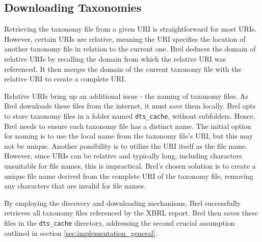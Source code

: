 
\subsection{Downloading Taxonomies}

Retrieving the taxonomy file from a given URI is straightforward for most URIs.
However, certain URIs are relative,
meaning the URI specifies the location of another taxonomy file in relation to the current one\cite{w3_relative_uri}.
Brel deduces the domain of relative URIs by recalling the domain from which the relative URI was referenced.
It then merges the domain of the current taxonomy file with the relative URI to create a complete URI.

Relative URIs bring up an additional issue - the naming of taxonomy files.
As Brel downloads these files from the internet, it must save them locally.
Brel opts to store taxonomy files in a folder named \texttt{dts\_cache}, without subfolders.
Hence, Brel needs to ensure each taxonomy file has a distinct name.
The initial option for naming is to use the local name from the taxonomy file's URI, but this may not be unique.
Another possibility is to utilize the URI itself as the file name.
However, since URIs can be relative and typically long, including characters unsuitable for file names, this is impractical.
Brel's chosen solution is to create a unique file name derived from the complete URI of the taxonomy file,
removing any characters that are invalid for file names.

By employing the discovery and downloading mechanisms,
Brel successfully retrieves all taxonomy files referenced by the XBRL report.
Brel then saves these files in the \texttt{dts\_cache} directory,
addressing the second crucial assumption outlined in section \ref{sec:implementation_general}.
